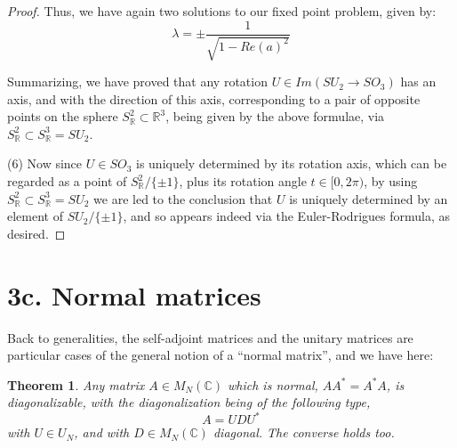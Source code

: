\documentclass[12pt]{amsbook}
\newtheorem{theorem}{Theorem}[chapter]
\begin{document}
\begin{proof}
Thus, we have again two solutions to our fixed point problem, given by:
$$\lambda=\pm\frac{1}{\sqrt{1-Re(a)^2}}$$

Summarizing, we have proved that any rotation $U\in Im(SU_2\to SO_3)$ has an axis, and with the direction of this axis, corresponding to a pair of opposite points on the sphere $S^2_\mathbb R\subset\mathbb R^3$, being given by the above formulae, via $S^2_\mathbb R\subset S^3_\mathbb R=SU_2$.

\medskip

(6) Now since $U\in SO_3$ is uniquely determined by its rotation axis, which can be regarded as a point of $S^2_\mathbb R/\{\pm1\}$, plus its rotation angle $t\in[0,2\pi)$, by using $S^2_\mathbb R\subset S^3_\mathbb R=SU_2$ we are led to the conclusion that $U$ is uniquely determined by an element of $SU_2/\{\pm 1\}$, and so appears indeed via the Euler-Rodrigues formula, as desired.
\end{proof}

\section*{3c. Normal matrices} 

Back to generalities, the self-adjoint matrices and the unitary matrices are particular cases of the general notion of a ``normal matrix'', and we have here:


\begin{theorem}
Any matrix $A\in M_N(\mathbb C)$ which is normal, $AA^*=A^*A$, is diagonalizable, with the diagonalization being of the following type,
$$A=UDU^*$$
with $U\in U_N$, and with $D\in M_N(\mathbb C)$ diagonal. The converse holds too.
\end{theorem}
\end{document}
